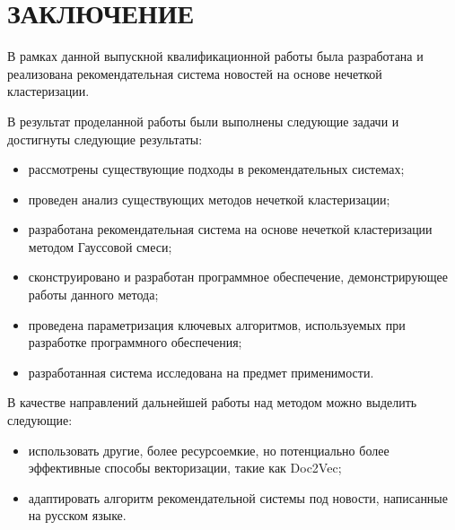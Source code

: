 \section*{ЗАКЛЮЧЕНИЕ}

В рамках данной выпускной квалификационной работы была разработана и реализована рекомендательная система новостей на основе нечеткой кластеризации.

В результат проделанной работы были выполнены следующие задачи и достигнуты следующие результаты:

\begin{itemize}
	\item рассмотрены существующие подходы в рекомендательных системах;
	\item проведен анализ существующих методов нечеткой кластеризации;
	\item разработана рекомендательная система на основе нечеткой кластеризации методом Гауссовой смеси;
	\item сконструировано и разработан программное обеспечение, демонстрирующее работы данного метода;
	\item проведена параметризация ключевых алгоритмов, используемых при разработке программного обеспечения;
	\item разработанная система исследована на предмет применимости.
\end{itemize}

В качестве направлений дальнейшей работы над методом можно выделить следующие:

\begin{itemize}
	\item использовать другие, более ресурсоемкие, но потенциально более эффективные способы векторизации, такие как Doc2Vec;
	\item адаптировать алгоритм рекомендательной системы под новости, написанные на русском языке.
\end{itemize}

\pagebreak
